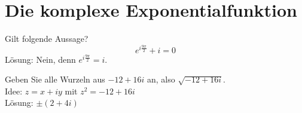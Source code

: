\section{Die komplexe Exponentialfunktion}
Gilt folgende Aussage?
\begin{displaymath}
  e^{i \frac{9\pi}{2}} + i = 0
\end{displaymath}
Lösung: Nein, denn $e^{i \frac{9\pi}{2}} = i$.

Geben Sie alle Wurzeln aus $-12 + 16i$ an, also $\sqrt{-12 + 16i}$.\\
Idee: $z = x+iy$ mit $z^2 = -12 + 16i$\\
Lösung: $\pm (2 + 4i)$
